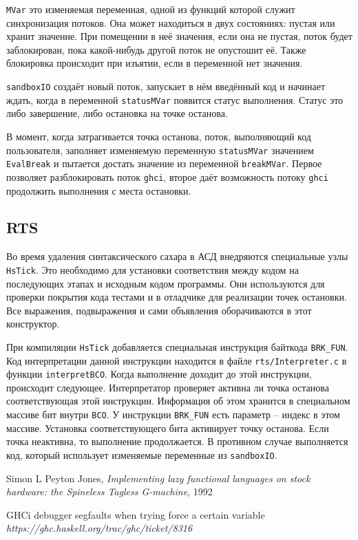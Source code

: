 \documentclass[fontsize=14pt, paper=a4, pagesize, DIV=calc]{scrartcl}
\def\code#1{\texttt{#1}}
\begin{document}
\code{MVar} это изменяемая переменная, одной из функций которой служит
синхронизация потоков. Она может находиться в двух состояниях: пустая или
хранит значение. При помещении в неё значения, если она не пустая, поток будет
заблокирован, пока какой-нибудь другой поток не опустошит её. Также блокировка
происходит при изъятии, если в переменной нет значения.

\code{sandboxIO} создаёт новый поток, запускает в нём введённый код и начинает
ждать, когда в переменной \code{statusMVar} появится статус выполнения. Статус
это либо завершение, либо остановка на точке останова. 

В момент, когда затрагивается точка останова, поток, выполняющий код
пользователя, заполняет изменяемую переменную \code{statusMVar} значением
\code{EvalBreak} и пытается достать значение из переменной \code{breakMVar}.
Первое позволяет разблокировать поток \code{ghci}, второе даёт возможность
потоку \code{ghci} продолжить выполнения с места остановки.

\subsection{RTS}

Во время удаления синтаксического сахара в АСД внедряются специальные узлы
\code{HsTick}. Это необходимо для установки соответствия между кодом на
последующих этапах и исходным кодом программы. Они используются для проверки
покрытия кода тестами и в отладчике для реализации точек остановки. Все
выражения, подвыражения и сами объявления оборачиваются в этот конструктор.

При компиляции \code{HsTick} добавляется специальная инструкция байткода
\code{BRK\_FUN}. Код интерпретации данной инструкции находится в файле
\code{rts/Interpreter.c} в функции \code{interpretBCO}. Когда выполнение
доходит до этой инструкции, происходит следующее. Интерпретатор проверяет
активна ли точка останова соответствующая этой инструкции. Информация об этом
хранится в специальном массиве бит внутри \code{BCO}. У инструкции
\code{BRK\_FUN} есть параметр -- индекс в этом массиве. Установка
соответствующего бита активирует точку останова.  Если точка неактивна, то
выполнение продолжается.  В противном случае выполняется код, который
использует изменяемые переменные из \code{sandboxIO}.

\begin{thebibliography}{9}

Simon L Peyton Jones,
\emph{Implementing lazy functional languages on stock hardware: the Spineless
Tagless G-machine}, 1992

GHCi debugger segfaults when trying force a certain variable
\emph{https://ghc.haskell.org/trac/ghc/ticket/8316}

\end{thebibliography}
\end{document}
